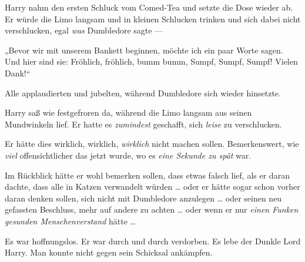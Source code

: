 Harry nahm den ersten Schluck vom Comed-Tea und setzte die Dose wieder ab. Er würde die Limo langsam und in kleinen Schlucken trinken und sich dabei nicht verschlucken, egal \emph{was} Dumbledore sagte —

„Bevor wir mit unserem Bankett beginnen, möchte ich ein paar Worte sagen. Und hier sind sie: Fröhlich, fröhlich, bumm bumm, Sumpf, Sumpf, Sumpf! Vielen Dank!“

Alle applaudierten und jubelten, während Dumbledore sich wieder hinsetzte.

Harry saß wie festgefroren da, während die Limo langsam aus seinen Mundwinkeln lief. Er hatte es \emph{zumindest} geschafft, sich \emph{leise} zu verschlucken.

Er hätte dies wirklich, wirklich, \emph{wirklich} nicht machen sollen. Bemerkenswert, wie \emph{viel} offensichtlicher das jetzt wurde, wo es \emph{eine Sekunde zu spät} war.

Im Rückblick hätte er wohl bemerken sollen, dass etwas falsch lief, als er daran dachte, dass alle in Katzen verwandelt würden … oder er hätte sogar schon vorher daran denken sollen, sich nicht mit Dumbledore anzulegen … oder seinen neu gefassten Beschluss, mehr auf andere zu achten … oder wenn er nur \emph{einen Funken gesunden Menschenverstand} hätte …

Es war hoffnungslos. Er war durch und durch verdorben. Es lebe der Dunkle Lord Harry. Man konnte nicht gegen sein Schicksal ankämpfen.

